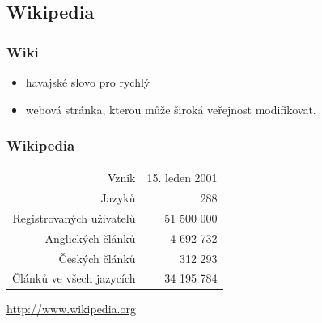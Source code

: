 \documentclass[xetex]{beamer}
\begin{document}
\subsection{Wikipedia}
\begin{frame}
	\frametitle{Wiki}
	\begin{itemize}
		\item<1-2> havajské slovo pro rychlý
		\item<2-2> webová stránka, kterou může široká veřejnost modifikovat.	
	\end{itemize}
\end{frame}
\begin{frame}
	\frametitle{Wikipedia}
	\begin{center}
	\begin{tabular}{r r}
	Vznik				& 15. leden 2001\\
	Jazyků				&        288\\
	Registrovaných uživatelů 	& 51 500 000\\
	Anglických článků 		&  4 692 732\\
	Českých článků	    		&    312 293\\
	Článků ve všech jazycích	& 34 195 784\\
	\end{tabular}

	\medskip

	\url{http://www.wikipedia.org}
	\end{center}
\end{frame}
\end{document}

